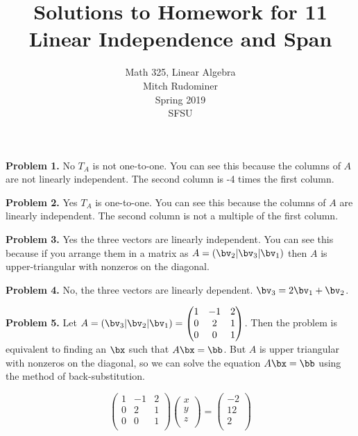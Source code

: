 \documentclass[oneside,12pt]{amsart}
\begin{document}
\title{Solutions to Homework for 11 \\ Linear Independence and Span}
\author{Math 325, Linear Algebra \\ Mitch Rudominer \\ Spring 2019 \\ SFSU }
\date{}

\maketitle


\textbf{Problem 1.} No $T_A$ is not one-to-one. You can see this because
the columns of $A$ are not linearly independent. The second column is
-4 times the first column.

\bigskip

\textbf{Problem 2.} Yes $T_A$ is one-to-one. You can see this because
the columns of $A$ are linearly independent. The second column is
not a multiple of the first column.

\bigskip

\textbf{Problem 3.} Yes the three vectors are linearly independent. You can
see this because if you arrange them in a matrix as
$A = (\bv_2 \vert \bv_3 \vert \bv_1)$ then $A$ is upper-triangular with
nonzeros on the diagonal.

\bigskip

\textbf{Problem 4.} No, the three vectors are linearly dependent.
$\bv_3 = 2\bv_1 + \bv_2$.

\bigskip

\textbf{Problem 5.} Let
$A = \left(\bv_3 \vert \bv_2 \vert \bv_1 \right) =
\begin{pmatrix}
1 & -1 & 2\\
0 &  2 & 1 \\
0 &  0 & 1  \\
\end{pmatrix}
$.
Then the problem is equivalent to finding an $\bx$ such that $A\bx=\bb$.
But $A$ is upper triangular with nonzeros on the diagonal, so we can
solve the equation $A\bx=\bb$ using the method of back-substitution.

$$
\begin{pmatrix}
1 & -1 & 2 \\
0 &  2 & 1 \\
0 &  0 & 1  \\
\end{pmatrix}
\begin{pmatrix}
x \\
y \\
z \\
\end{pmatrix}
=
\begin{pmatrix}
-2 \\
12 \\
2 \\
\end{pmatrix}
$$
\end{document}
